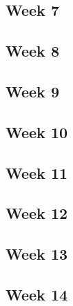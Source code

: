 \documentclass[11pt]{article}
\begin{document}
        \subsection*{Week 7}
        \subsection*{Week 8}
        \subsection*{Week 9}
        \subsection*{Week 10}
        \subsection*{Week 11}
        \subsection*{Week 12}
        \subsection*{Week 13}
        \subsection*{Week 14}
\end{document}
